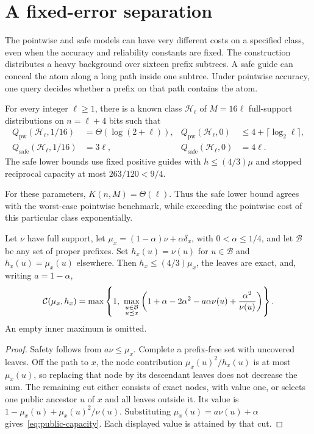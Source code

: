 \section{A fixed-error separation}\label{sec:fixed-class}
The pointwise and safe models can have very different costs on a specified class, even when the accuracy and reliability constants are fixed. The construction distributes a heavy background over sixteen prefix subtrees. A safe guide can conceal the atom along a long path inside one subtree. Under pointwise accuracy, one query decides whether a prefix on that path contains the atom.

\begin{theorem}\label{thm:fixed-class}
For every integer $\ell\ge1$, there is a known class $\mathcal H_\ell$ of $M=16\ell$ full-support distributions on $n=\ell+4$ bits such that
\begin{align}
 Q_{\mathrm{pw}}(\mathcal H_\ell,1/16)
   &=\Theta(\log(2+\ell)),
 &Q_{\mathrm{pw}}(\mathcal H_\ell,0)
   &\le4+\lceil\log_2\ell\rceil,\label{eq:fixed-point}\\
 Q_{\mathrm{safe}}(\mathcal H_\ell,1/16)&=3\ell,
 &Q_{\mathrm{safe}}(\mathcal H_\ell,0)&=4\ell.\label{eq:fixed-safe}
\end{align}
The safe lower bounds use fixed positive guides with $h\le(4/3)\mu$ and stopped reciprocal capacity at most $263/120<9/4$.
\end{theorem}

For these parameters, $K(n,M)=\Theta(\ell)$. Thus the safe lower bound agrees with the worst-case pointwise benchmark, while exceeding the pointwise cost of this particular class exponentially.

\begin{lemma}\label{lem:public-capacity}
Let $\nu$ have full support, let $\mu_x=(1-\alpha)\nu+\alpha\delta_x$, with $0<\alpha\le1/4$, and let $\mathcal B$ be any set of proper prefixes. Set $h_x(u)=\nu(u)$ for $u\in\mathcal B$ and $h_x(u)=\mu_x(u)$ elsewhere. Then $h_x\le(4/3)\mu_x$, the leaves are exact, and, writing $a=1-\alpha$,
\begin{equation}\label{eq:public-capacity}
 \CC(\mu_x,h_x)=\max\left\{1,\ 
 \max_{\substack{u\in\mathcal B\\u\preceq x}}
 \left(1+\alpha-2\alpha^2-a\alpha\nu(u)
                    +\frac{\alpha^2}{\nu(u)}\right)\right\}.
\end{equation}
An empty inner maximum is omitted.
\end{lemma}
\begin{proof}
Safety follows from $a\nu\le\mu_x$. Complete a prefix-free set with uncovered leaves. Off the path to $x$, the node contribution $\mu_x(u)^2/h_x(u)$ is at most $\mu_x(u)$, so replacing that node by its descendant leaves does not decrease the sum. The remaining cut either consists of exact nodes, with value one, or selects one public ancestor $u$ of $x$ and all leaves outside it. Its value is $1-\mu_x(u)+\mu_x(u)^2/\nu(u)$. Substituting $\mu_x(u)=a\nu(u)+\alpha$ gives~\eqref{eq:public-capacity}. Each displayed value is attained by that cut.
\end{proof}

